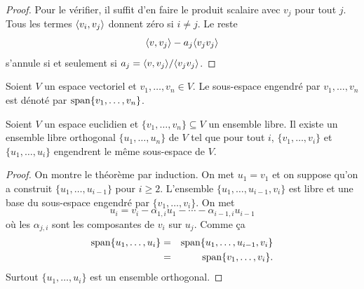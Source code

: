\begin{proof}
  Pour le vérifier, il suffit d'en faire le produit scalaire avec $v_j$ pour tout $j$. Tous les termes $\langle {v_i,v_j} \rangle$ donnent zéro si $i\neq j$. Le reste
  \begin{displaymath}
    \langle {v,v_j} \rangle - a_j\langle {v_jv_j} \rangle
  \end{displaymath}
s'annule si et seulement si $a_j = \langle {v,v_j} \rangle/\langle {v_jv_j} \rangle$. 
\end{proof}



\begin{notation}
  Soient $V$ un espace vectoriel et $v_1,\dots,v_n \in V$. Le sous-espace engendré par $v_1,\dots,v_n$ est dénoté par  $\operatorname{span}\{v_1,\dots,v_n\}$. 
\end{notation}



\begin{theorem}
  \label{thr:2}
  Soient $V$ un espace euclidien et  $\{v_1,\dots,v_n\} \subseteq V$
  un ensemble libre.  
  Il existe un ensemble libre orthogonal $\{u_1,\dots,u_n\}$
  de $V$
  tel que pour tout $i$, 
  $\{v_1,\dots,v_i\}$
  et $\{u_1,\dots,u_i\}$ engendrent le même sous-espace de $V$.
\end{theorem}


\begin{proof}
  On montre le théorème par induction.  On met $u_1 = v_1$
  et on suppose qu'on a construit $\{u_1,\dots,u_{i-1}\}$
  pour $i \geq 2$.
  L'ensemble $\{u_1,\dots,u_{i-1},v_i\}$
  est libre et une base du sous-espace engendré
  par $\{v_1,\dots,v_i\}$.
  On met  
  \begin{displaymath}
    u_i = v_i - \alpha_{1,i}  u_1 - \cdots - \alpha_{i-1,i} u_{i-1}
  \end{displaymath}
  où les $\alpha_{j,i}$
  sont les composantes de $v_i$
  sur $u_j$.
  Comme ça 
  \begin{eqnarray*}
    \operatorname{span} \{u_1,\dots,u_i\} & = & \operatorname{span}\{u_1,\dots,u_{i-1},v_i\} \\
                           &=  &\operatorname{span}\{v_1,\dots,v_i\}.
  \end{eqnarray*}
  Surtout $\{u_1,\dots,u_i\}$ est un ensemble orthogonal.  
\end{proof}



